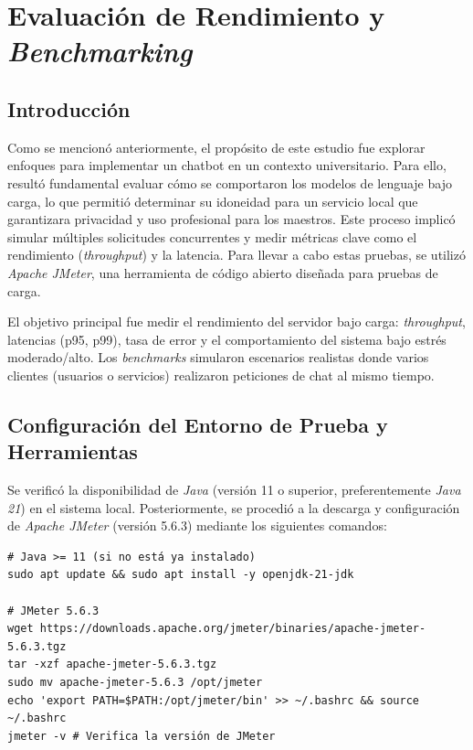\chapter{Evaluación de Rendimiento y \textit{Benchmarking}}

\section{Introducción}
Como se mencionó anteriormente, el propósito de este estudio fue explorar enfoques para implementar un chatbot en un contexto universitario. Para ello, resultó fundamental evaluar cómo se comportaron los modelos de lenguaje bajo carga, lo que permitió determinar su idoneidad para un servicio local que garantizara privacidad y uso profesional para los maestros. Este proceso implicó simular múltiples solicitudes concurrentes y medir métricas clave como el rendimiento (\textit{throughput}) y la latencia. Para llevar a cabo estas pruebas, se utilizó \textit{Apache JMeter}, una herramienta de código abierto diseñada para pruebas de carga.

El objetivo principal fue medir el rendimiento del servidor bajo carga: \textit{throughput}, latencias (p95, p99), tasa de error y el comportamiento del sistema bajo estrés moderado/alto. Los \textit{benchmarks} simularon escenarios realistas donde varios clientes (usuarios o servicios) realizaron peticiones de chat al mismo tiempo.

\section{Configuración del Entorno de Prueba y Herramientas}
Se verificó la disponibilidad de \textit{Java} (versión 11 o superior, preferentemente \textit{Java 21}) en el sistema local. Posteriormente, se procedió a la descarga y configuración de \textit{Apache JMeter} (versión 5.6.3) mediante los siguientes comandos:
\newpage
\begin{verbatim}
# Java >= 11 (si no está ya instalado)
sudo apt update && sudo apt install -y openjdk-21-jdk

# JMeter 5.6.3
wget https://downloads.apache.org/jmeter/binaries/apache-jmeter-5.6.3.tgz
tar -xzf apache-jmeter-5.6.3.tgz
sudo mv apache-jmeter-5.6.3 /opt/jmeter
echo 'export PATH=$PATH:/opt/jmeter/bin' >> ~/.bashrc && source ~/.bashrc
jmeter -v # Verifica la versión de JMeter
\end{verbatim}

